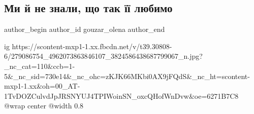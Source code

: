  
 
 
 
 


\subsection{Ми й не знали, що так її любимо}
\label{sec:26_04_2022.fb.gouzar_olena.1.ne_znaly_scho_tak_ii_ljubymo}
 
\ifcmt
 author_begin
   author_id gouzar_olena
 author_end
\fi


\ifcmt
  ig https://scontent-mxp1-1.xx.fbcdn.net/v/t39.30808-6/279086754_4962073863846107_3824586438687799067_n.jpg?_nc_cat=110&ccb=1-5&_nc_sid=730e14&_nc_ohc=zKJK66MKbi0AX9jFQdS&_nc_ht=scontent-mxp1-1.xx&oh=00_AT-1TvDOZCulvdJpJRSNYUJ4TPIWoinSN_oxcQHofWnDvw&oe=6271B7C8
  @wrap center
  @width 0.8
\fi

